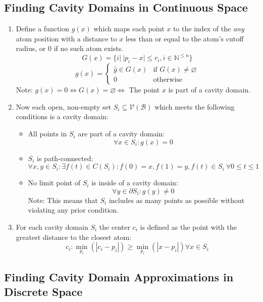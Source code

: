   \subsection{Finding Cavity Domains in Continuous Space}
  \begin{enumerate}
  \item{Define a function $g(x)$ which maps each point $x$ to the index of the \emph{any} atom position with a distance to $x$ less than or equal to the atom's cutoff radius, or 0 if no such atom exists.
  \[G(x) = \{i|~ |p_{i}-x| \le r_i,i \in \mathbb{N}^{\le n}\}\]
  \[g(x) = \left\{\begin{array}{ll}\hat{g} \in G(x)&\text{if } G(x) \ne \varnothing\\0&\text{otherwise}\end{array}\right.\]
  Note: $g(x) = 0 \Leftrightarrow G(x) = \varnothing \Leftrightarrow$ The point $x$ is part of a cavity domain.}
  \item{Now each open, non-empty set $S_i \subseteq \mathcal{V}(\mathcal{B})$ which meets the following conditions is a cavity domain:
  \begin{itemize}
  \item{All points in $S_i$ are part of a cavity domain:
  \[\forall x \in S_i\colon g(x) = 0\]}
  \item{$S_i$ is path-connected:
  \[\forall x, y \in S_i\colon \exists f(t) \in C(S_i)\colon f(0) = x, f(1) = y, f(t) \in S_i ~ \forall 0 \le t \le 1\]}
  \item{No limit point of $S_i$ is inside of a cavity domain:
  \[\forall y \in \partial{S_i}\colon g(y) \ne 0 \]
  Note: This means that $S_i$ includes as many points as possible without violating any prior condition.}
  \end{itemize}}
  \item{For each cavity domain $S_i$ the center $c_i$ is defined as the point with the greatest distance to the closest atom:
  \[c_i\colon \min_{p_i}(|c_i-p_i|) \ge \min_{p_i}(|x-p_i|) \forall x \in S_i\]
  }
  \end{enumerate}
  


\subsection{Finding Cavity Domain Approximations in Discrete Space}


